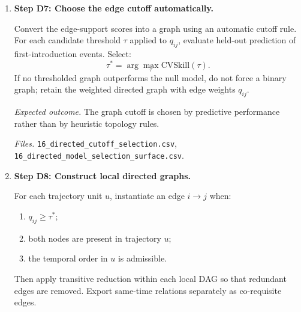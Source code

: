 \begin{enumerate}
    For each child skill $j$, fit a sparse conditional model predicting first appearance from
    previously observed skills. A practical choice is a sparse logistic or discrete-time hazard model.
    The model is estimated only with predictors that satisfy the temporal constraint. Then repeat
    the estimation across bootstrap resamples of trajectory units and record the selection frequency
    of each admissible edge:
    \[
    q_{ij} = \Pr(i \rightarrow j \text{ is selected across bootstrap refits}).
    \]

    \textit{Expected outcome.}
    Each admissible edge $i \rightarrow j$ receives an empirical support score rather than a
    hand-made decision.

    \textit{Files.}
    \texttt{15\_direct\_parent\_scores.csv},
    \texttt{15\_bootstrap\_selection\_summary.csv}.

    \item \textbf{Step D7: Choose the edge cutoff automatically.}

    Convert the edge-support scores into a graph using an automatic cutoff rule. For each candidate
    threshold $\tau$ applied to $q_{ij}$, evaluate held-out prediction of first-introduction events.
    Select:
    \[
    \tau^* = \arg\max_{\tau} \mathrm{CVSkill}(\tau).
    \]
    If no thresholded graph outperforms the null model, do not force a binary graph; retain the
    weighted directed graph with edge weights $q_{ij}$.

    \textit{Expected outcome.}
    The graph cutoff is chosen by predictive performance rather than by heuristic topology rules.

    \textit{Files.}
    \texttt{16\_directed\_cutoff\_selection.csv},
    \texttt{16\_directed\_model\_selection\_surface.csv}.

    \item \textbf{Step D8: Construct local directed graphs.}

    For each trajectory unit $u$, instantiate an edge $i \rightarrow j$ when:
    \begin{enumerate}
        \item $q_{ij} \ge \tau^*$;
        \item both nodes are present in trajectory $u$;
        \item the temporal order in $u$ is admissible.
    \end{enumerate}
    Then apply transitive reduction within each local DAG so that redundant edges are removed.
    Export same-time relations separately as co-requisite edges.


\end{enumerate}
